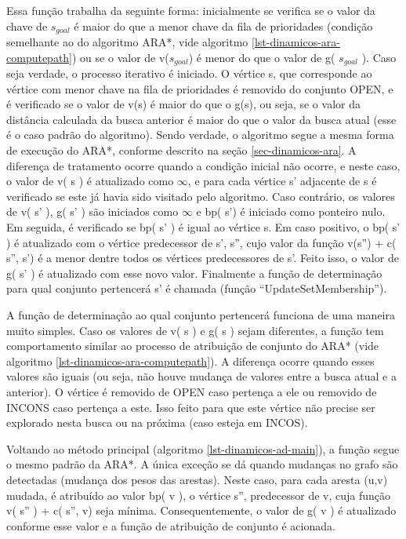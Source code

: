 Essa função trabalha da seguinte forma: inicialmente se verifica se o valor da chave de $s_{goal}$ é maior do que a menor chave da fila de prioridades (condição semelhante ao do algoritmo ARA*, vide algoritmo \ref{lst-dinamicos-ara-computepath}) ou se o valor de v($s_{goal}$) é menor do que o valor de g( $s_{goal}$ ). Caso seja verdade, o processo iterativo é iniciado. O vértice s, que corresponde ao vértice com menor chave na fila de prioridades é removido do conjunto OPEN, e é verificado se o valor de v(s) é maior do que o g(s), ou seja, se o valor da distância calculada da busca anterior é maior do que o valor da busca atual (esse é o caso padrão do algoritmo). Sendo verdade, o algoritmo segue a mesma forma de execução do ARA*, conforme descrito na seção \ref{sec-dinamicos-ara}. A diferença de tratamento ocorre quando a condição inicial não ocorre, e neste caso, o valor de v( s ) é atualizado como $\infty$, e para cada vértice s' adjacente de s é verificado se este já havia sido visitado pelo algoritmo. Caso contrário, os valores de v( s' ), g( s' ) são iniciados como $\infty$ e bp( s') é iniciado como ponteiro nulo. Em seguida, é verificado se bp( s' ) é igual ao vértice s. Em caso positivo, o bp( s' ) é atualizado com o vértice predecessor de s', s'', cujo valor da função v(s'') + c( s'', s') é a menor dentre todos os vértices predecessores de s'. Feito isso, o valor de g( s' ) é atualizado com esse novo valor. Finalmente a função de determinação para qual conjunto pertencerá s' é chamada (função ``UpdateSetMembership'').

A função de determinação ao qual conjunto pertencerá funciona de uma maneira muito simples. Caso os valores de v( s ) e g( s ) sejam diferentes, a função tem comportamento similar ao processo de atribuição de conjunto do ARA* (vide algoritmo \ref{lst-dinamicos-ara-computepath}). A diferença ocorre quando esses valores são iguais (ou seja, não houve mudança de valores entre a busca atual e a anterior). O vértice é removido de OPEN caso pertença a ele ou removido de INCONS caso pertença a este. Isso feito para que este vértice não precise ser explorado nesta busca ou na próxima (caso esteja em INCOS).

Voltando ao método principal (algoritmo \ref{lst-dinamicos-ad-main}), a função segue o mesmo padrão da ARA*. A única exceção se dá quando mudanças no grafo são detectadas (mudança dos pesos das arestas). Neste caso, para cada aresta (u,v) mudada, é atribuído ao valor bp( v ), o vértice s'', predecessor de v, cuja função v( s'' ) + c( s'', v) seja mínima. Consequentemente, o valor de g( v ) é atualizado conforme esse valor e a função de atribuição de conjunto é acionada. 